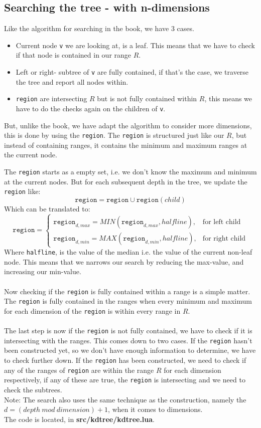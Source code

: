 \documentclass{article}
\begin{document}
\subsection{Searching the tree - with n-dimensions}
Like the algorithm for searching in the book, we have 3 cases.
\begin{itemize}
 \item Current node \texttt{v} we are looking at, is a leaf. This means that we have to check if that node is contained in our range $R$.
 \item Left or right- subtree of \texttt{v} are fully contained, if that's the case, we traverse the tree and report all nodes within.
 \item \texttt{region} are intersecting $R$ but is not fully contained within $R$, this means we have to do the checks again on the children of \texttt{v}.
\end{itemize}
But, unlike the book, we have adapt the algorithm to consider more dimensions, this is done by using the \texttt{region}.
The \texttt{region} is structured just like our $R$, but instead of containing ranges, it contains the minimum and maximum ranges at the current node.

The \texttt{region} starts as a empty set, i.e. we don't know the maximum and minimum at the current nodes. 
But for each subsequent depth in the tree, we update the \texttt{region} like:
\[
    \texttt{region}= 
    \texttt{region} \cup \texttt{region}(child)
\]
Which can be translated to:
\[
    \texttt{region}= 
\begin{cases}
    \texttt{region}_{d,max} = MIN(\texttt{region}_{d,max},halfline),&\text{for left child} \\
    \texttt{region}_{d,min} = MAX(\texttt{region}_{d,min},halfline),& \text{for right child}
\end{cases}
\]
Where \texttt{halfline}, is the value of the median i.e. the value of the current non-leaf node.
This means that we narrows our search by reducing the max-value, and increasing our min-value.\\
 \\
Now checking if the \texttt{region} is fully contained within a range is a simple matter.
The \texttt{region} is fully contained in the ranges when every minimum and maximum for each dimension of the \texttt{region} is within every range in $R$.\\
 \\
The last step is now if the \texttt{region} is not fully contained, we have to check if it is intersecting with the ranges. This comes down to two cases.
If the \texttt{region} hasn't been constructed yet, so we don't have enough information to determine, we have to check further down.
If the \texttt{region} has been constructed, we need to check if any of the ranges of \texttt{region} are within the range $R$ for each dimension respectively, if any of these are true,
the \texttt{region} is intersecting and we need to check the subtrees.\\
Note: The search also uses the same technique as the construction, namely the $d = (depth\ mod\ dimension)+1$, when it comes to dimensions.
 \\
The code is located, in \textbf{src/kdtree/kdtree.lua}.
\end{document}
